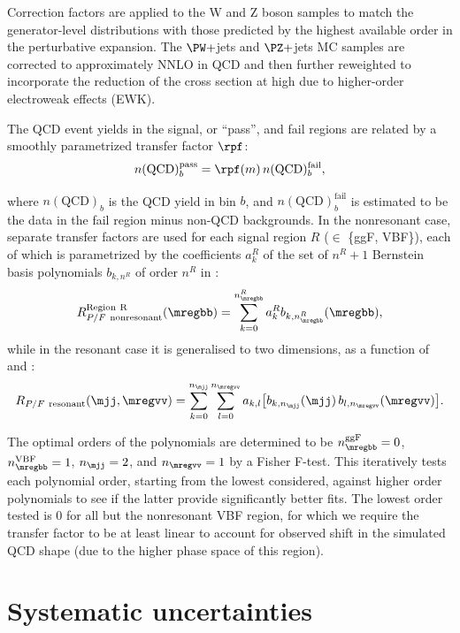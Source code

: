 Correction factors are applied to the W and Z boson samples to match the generator-level \pt distributions with those predicted by the highest available order in the perturbative expansion.
The $\PW+$jets and $\PZ+$jets MC samples are corrected to approximately NNLO in QCD and then further reweighted to incorporate the reduction of the cross section at high \pt due to higher-order electroweak effects (EWK).

The QCD event yields in the signal, or ``pass'', and fail regions are related by a smoothly parametrized transfer factor $\rpf$:
\begin{equation}
n(\mathrm{QCD})^{\mathrm{pass}}_b = \rpf(m)\, n(\mathrm{QCD})^{\mathrm{fail}}_b,
\end{equation}

where $n(\mathrm{QCD})_b$ is the QCD yield in bin $b$, and $n(\mathrm{QCD})^{\mathrm{fail}}_b$ is estimated to be the data in the fail region minus non-QCD backgrounds.
In the nonresonant case, separate transfer factors are used for each signal region $R$ ($\in$ \{ggF, VBF\}), each of which is parametrized by the coefficients $a^R_k$ of the set of $n^R + 1$ Bernstein basis polynomials $b_{k, n^R}$ of order $n^R$ in \mregbb:
\begin{equation}
R^{\mathrm{Region\ R}}_{P/F\ \textrm{nonresonant}}(\mregbb) = \sum^{n^R_\mregbb}_{k=0} a^R_k b_{k, n^R_\mregbb}(\mregbb),
\end{equation}
while in the resonant case it is generalised to two dimensions, as a function of \mjj and \mregvv:
\begin{equation}
R_{P/F\ \textrm{resonant}}(\mjj, \mregvv) = \sum^{n_\mjj}_{k=0} \sum^{n_\mregvv}_{l=0} a_{k,l} \big[ b_{k, n_\mjj}(\mjj)\, b_{l, n_\mregvv}(\mregvv)\big].
\end{equation}

The optimal orders of the polynomials are determined to be $n^{\mathrm{ggF}}_\mregbb = 0$, $n^{\mathrm{VBF}}_\mregbb = 1$, $n_\mjj = 2$, and $n_\mregvv = 1$ by a Fisher F-test.
This iteratively tests each polynomial order, starting from the lowest considered, against higher order polynomials to see if the latter provide significantly better fits.
The lowest order tested is 0 for all but the nonresonant VBF region, for which we require the transfer factor to be at least linear to account for observed shift in the simulated QCD \mregbb shape (due to the higher \mHH phase space of this region).

\section{Systematic uncertainties}
\label{sec:05_hh_systematics}

